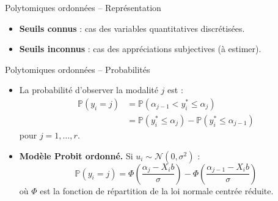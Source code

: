 \documentclass[11pt,aspectratio=169]{beamer}
\newcommand{\Prob}{\mathbb{P}}
\begin{document}
\begin{frame}{Polytomiques ordonnées -- Représentation}

\begin{center}
\end{center}

\vspace{0.3cm}

\begin{itemize}

\item \textbf{Seuils connus} : cas des variables quantitatives discrétisées.\newline

\item \textbf{Seuils inconnus} : cas des appréciations subjectives (à estimer).

\end{itemize}

\end{frame}

\begin{frame}{Polytomiques ordonnées -- Probabilités}

\begin{itemize}

\item La probabilité d'observer la modalité $j$ est :
  \begin{align*}
      \Prob(y_i = j) &= \Prob(\alpha_{j-1} < y_i^* \leq \alpha_j) \\
      &= \Prob(y_i^* \leq \alpha_j) - \Prob(y_i^* \leq \alpha_{j-1})
  \end{align*}
  pour $j = 1, \ldots, r$.\newline

\item \textbf{Modèle Probit ordonné.} Si $u_i \sim \mathcal{N}(0, \sigma^2)$ :
  \[
  \Prob(y_i = j) = \Phi\left(\frac{\alpha_j - X_i b}{\sigma}\right) - \Phi\left(\frac{\alpha_{j-1} - X_i b}{\sigma}\right)
  \]
  où $\Phi$ est la fonction de répartition de la loi normale centrée réduite.

\end{itemize}

\end{frame}
\end{document}
